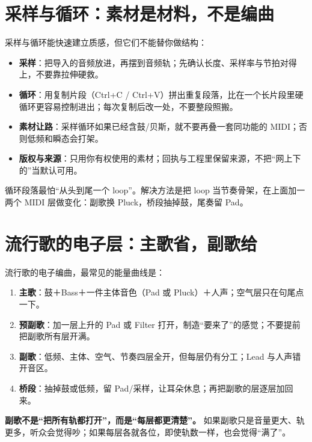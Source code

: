 \section{采样与循环：素材是材料，不是编曲}
\label{sec:sample-loop}

采样与循环能快速建立质感，但它们不能替你做结构：

\begin{itemize}
\item \textbf{采样}：把导入的音频放进，再摆到音频轨；先确认长度、采样率与节拍对得上，不要靠拉伸硬救。
\item \textbf{循环}：用复制片段（Ctrl+C / Ctrl+V）拼出重复段落，比在一个长片段里硬循环更容易控制进出；每次复制后改一处，不要整段照搬。
\item \textbf{素材让路}：采样循环如果已经含鼓/贝斯，就不要再叠一套同功能的 MIDI；否则低频和瞬态会打架。
\item \textbf{版权与来源}：只用你有权使用的素材；回执与工程里保留来源，不把“网上下的”当默认可用。
\end{itemize}

循环段落最怕“从头到尾一个 loop”。解决方法是把 loop 当节奏骨架，在上面加一两个 MIDI 层做变化：副歌换 Pluck，桥段抽掉鼓，尾奏留 Pad。

\section{流行歌的电子层：主歌省，副歌给}
\label{sec:pop-layers}

流行歌的电子编曲，最常见的能量曲线是：

\begin{enumerate}
\item \textbf{主歌}：鼓＋Bass＋一件主体音色（Pad 或 Pluck）＋人声；空气层只在句尾点一下。
\item \textbf{预副歌}：加一层上升的 Pad 或 Filter 打开，制造“要来了”的感觉；不要提前把副歌所有层开满。
\item \textbf{副歌}：低频、主体、空气、节奏四层全开，但每层仍有分工；Lead 与人声错开音区。
\item \textbf{桥段}：抽掉鼓或低频，留 Pad/采样，让耳朵休息；再把副歌的层逐层加回来。
\end{enumerate}

\textbf{副歌不是“把所有轨都打开”，而是“每层都更清楚”。} 如果副歌只是音量更大、轨更多，听众会觉得吵；如果每层各就各位，即使轨数一样，也会觉得“满了”。

